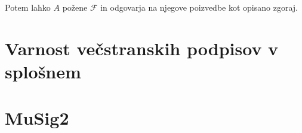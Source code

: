 \documentclass[isrm2, tisk]{fmfdelo}
\begin{document}
Potem lahko $A$ požene $\mathcal{F}$ in odgovarja na njegove poizvedbe kot opisano zgoraj.

\section{Varnost večstranskih podpisov v splošnem}
\section{MuSig2}

%
%
%
\end{document}
